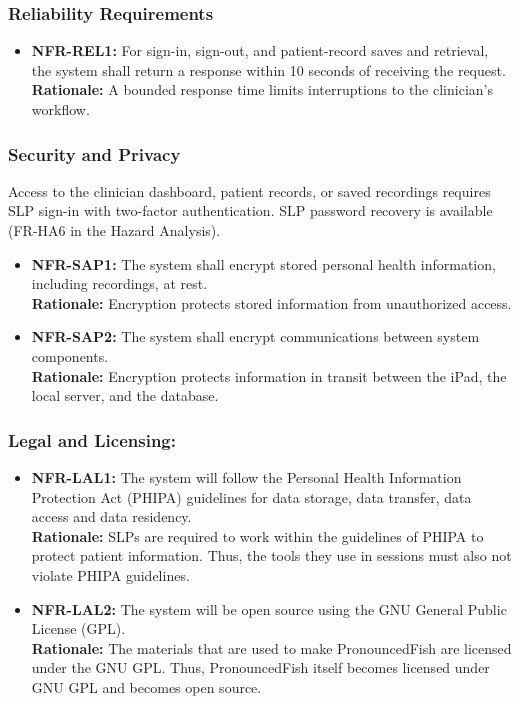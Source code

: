\documentclass[12pt]{article}
\begin{document}
    \subsubsection{Reliability Requirements}
    \begin{itemize}
        \item \textbf{NFR-REL1:} For sign-in, sign-out, and patient-record saves and retrieval, the system shall return a response within 10 seconds of receiving the request. \\
        \textbf{Rationale:} A bounded response time limits interruptions to the clinician's workflow.
    \end{itemize}

    \subsubsection{Security and Privacy}
    Access to the clinician dashboard, patient records, or saved recordings
    requires SLP sign-in with two-factor authentication. SLP password recovery
    is available (FR-HA6 in the Hazard Analysis).
    \begin{itemize}
        \item \textbf{NFR-SAP1:} The system shall encrypt stored personal health information, including recordings, at rest. \\
        \textbf{Rationale:} Encryption protects stored information from unauthorized access.
        \item \textbf{NFR-SAP2:} The system shall encrypt communications between system components. \\
        \textbf{Rationale:} Encryption protects information in transit between the iPad, the local server, and the database.
    \end{itemize}

    \subsubsection{Legal and Licensing:} 
    \begin{itemize}
        \item \textbf{NFR-LAL1:} The system will follow the Personal Health Information Protection Act (PHIPA) guidelines for data storage, data transfer, data access and data residency.\\
        \textbf{Rationale: } SLPs are required to work within the guidelines of PHIPA to protect patient information. Thus, the tools they use in sessions must also not violate PHIPA guidelines.
        \item \textbf{NFR-LAL2:} The system will be open source using the GNU General Public License (GPL).\\
        \textbf{Rationale:} The materials that are used to make PronouncedFish are licensed under the GNU GPL. Thus, PronouncedFish itself becomes licensed under GNU GPL and becomes open source.
    \end{itemize}
\end{document}
